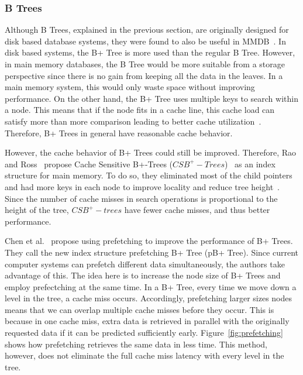 \documentclass[12pt,a4paper]{article}
\begin{document}

\subsubsection*{B Trees}
Although B Trees, explained in the previous section, are originally designed for disk based database systems, they were found to also be useful in
MMDB~\cite{lehman1986study}. In disk based systems, the B+ Tree is more used than the regular B Tree. However, in main memory databases, the B Tree would be
more suitable from a storage perspective since there is no gain from keeping all the data in the leaves. In a main memory system, this
would only waste space without improving performance. On the other hand, the B+ Tree uses multiple keys to search within a node. This means that
if the node fits in a cache line, this cache load can satisfy more than more comparison leading to better cache utilization~\cite{rao1999cache}. Therefore, B+
Trees in general have reasonable cache behavior.

However, the cache behavior of B+ Trees could still be improved. Therefore, Rao and Ross~\cite{rao2000making} propose Cache Sensitive B+-Trees
($CSB^{+}-Trees$)~\cite{rao2000making} as an index structure for main memory. To do so, they eliminated most of the child pointers and had more keys in each
node to improve locality and reduce tree height~\cite{luan2009prefetching}. Since the number of cache misses in search operations is proportional to the height
of the tree, $CSB^{+}-trees$ have fewer cache misses, and thus better performance.

Chen et al.~\cite{chen2001improving} propose using prefetching to improve the performance of B+ Trees. They call the new index structure prefetching B+ Tree
(pB+ Tree). Since current computer systems can prefetch different data simultaneously, the authors take advantage of this. The idea here is to increase the node
size of B+ Trees and employ prefectching at the same time. In a B+ Tree, every time we move down a level in the tree, a cache miss occurs. Accordingly,
prefetching larger sizes nodes means that we can overlap multiple cache misses before they occur. This is because in one cache miss, extra data is retrieved in
parallel with the originally requested data if it can be predicted sufficiently early. Figure~\ref{fig:prefetching} shows how prefetching retrieves the same
data in less time. This method, however, does not eliminate the full cache miss latency with every level in the tree.
\end{document}
